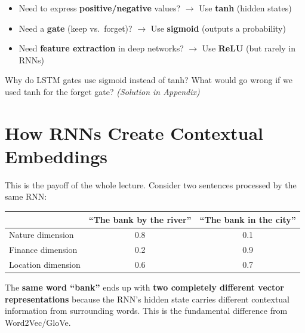 \documentclass[11pt,a4paper]{article}
\begin{document}
\begin{tcolorbox}[intuitionbox={The Rule of Thumb}]
\begin{itemize}[leftmargin=1em, itemsep=2pt]
    \item Need to express \textbf{positive/negative} values? $\to$ Use \textbf{tanh} (hidden states)
    \item Need a \textbf{gate} (keep vs.\ forget)? $\to$ Use \textbf{sigmoid} (outputs a probability)
    \item Need \textbf{feature extraction} in deep networks? $\to$ Use \textbf{ReLU} (but rarely in RNNs)
\end{itemize}
\end{tcolorbox}

\begin{tcolorbox}[questionbox={Self-Check Q3}]
Why do LSTM gates use sigmoid instead of tanh? What would go wrong if we used tanh for the forget gate? \textit{(Solution in Appendix)}
\end{tcolorbox}

\section{How RNNs Create Contextual Embeddings}

This is the payoff of the whole lecture. Consider two sentences processed by the same RNN:

\begin{center}
\renewcommand{\arraystretch}{1.3}
\begin{tabular}{@{}lcc@{}}
\toprule
& \textbf{``The bank by the river''} & \textbf{``The bank in the city''} \\
\midrule
Nature dimension & 0.8 & 0.1 \\
Finance dimension & 0.2 & 0.9 \\
Location dimension & 0.6 & 0.7 \\
\bottomrule
\end{tabular}
\end{center}

The \textbf{same word ``bank''} ends up with \textbf{two completely different vector representations} because the RNN's hidden state carries different contextual information from surrounding words. This is the fundamental difference from Word2Vec/GloVe.

\end{document}
